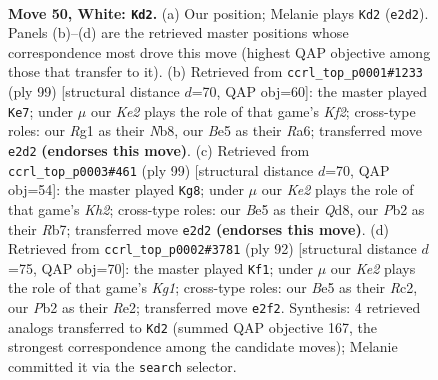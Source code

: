 \documentclass[11pt]{article}
\begin{document}
\clearpage

\begin{figure}[p]\centering
\begin{subfigure}{0.46\textwidth}\centering
\resizebox{\linewidth}{!}{%
\newchessgame
\chessboard[
  setfen={5b1r/r2k2p1/p1p5/Pp1bBp1p/2p2P1P/4P1P1/1P2K2N/R5R1 w - - 1 50},
  showmover=false,
  pgfstyle=straightmove, color=movearrow, markmove={e2-d2}
]}
\caption{}
\end{subfigure}\hfill
\begin{subfigure}{0.46\textwidth}\centering
\resizebox{\linewidth}{!}{%
\newchessgame
\chessboard[
  setfen={1n6/p4k2/r1p1p2b/1p2Pp2/1P1P2p1/P5P1/NBR1KP1r/5R2 b - - 24 50},
  showmover=false,
  pgfstyle=straightmove, color=movearrow, markmove={f7-e7}
]}
\caption{}
\end{subfigure}
\\[4pt]
\begin{subfigure}{0.46\textwidth}\centering
\resizebox{\linewidth}{!}{%
\newchessgame
\chessboard[
  setfen={3q4/pr4pk/1p1Pp2p/2p1Bp2/2P1bP2/4P2P/P2R2PK/3Q4 b - - 19 50},
  showmover=false,
  pgfstyle=straightmove, color=movearrow, markmove={h7-g8}
]}
\caption{}
\end{subfigure}\hfill
\begin{subfigure}{0.46\textwidth}\centering
\resizebox{\linewidth}{!}{%
\newchessgame
\chessboard[
  setfen={1k3r2/1npb4/r1pb1p2/p5p1/N2BB2p/1P3P1P/P1R1R1P1/6K1 w - - 43 47},
  showmover=false,
  pgfstyle=straightmove, color=movearrow, markmove={g1-f1}
]}
\caption{}
\end{subfigure}
\caption{\textbf{Move 50, White: \texttt{Kd2}.} (a) Our position; Melanie plays \texttt{Kd2} (\texttt{e2d2}). Panels (b)--(d) are the retrieved master positions whose correspondence most drove this move (highest QAP objective among those that transfer to it). (b) Retrieved from \texttt{ccrl\_top\_p0001\#1233} (ply 99) [structural distance $d$=70, QAP obj=60]: the master played \texttt{Ke7}; under $\mu$ our \emph{Ke2} plays the role of that game's \emph{Kf2}; cross-type roles: our \emph{R}g1 as their \emph{N}b8, our \emph{B}e5 as their \emph{R}a6; transferred move \texttt{e2d2} \textbf{(endorses this move)}. (c) Retrieved from \texttt{ccrl\_top\_p0003\#461} (ply 99) [structural distance $d$=70, QAP obj=54]: the master played \texttt{Kg8}; under $\mu$ our \emph{Ke2} plays the role of that game's \emph{Kh2}; cross-type roles: our \emph{B}e5 as their \emph{Q}d8, our \emph{P}b2 as their \emph{R}b7; transferred move \texttt{e2d2} \textbf{(endorses this move)}. (d) Retrieved from \texttt{ccrl\_top\_p0002\#3781} (ply 92) [structural distance $d$=75, QAP obj=70]: the master played \texttt{Kf1}; under $\mu$ our \emph{Ke2} plays the role of that game's \emph{Kg1}; cross-type roles: our \emph{B}e5 as their \emph{R}c2, our \emph{P}b2 as their \emph{R}e2; transferred move \texttt{e2f2}. Synthesis: 4 retrieved analogs transferred to \texttt{Kd2} (summed QAP objective 167, the strongest correspondence among the candidate moves); Melanie committed it via the \texttt{search} selector.}
\label{fig:thought-m98}
\end{figure}
\end{document}
